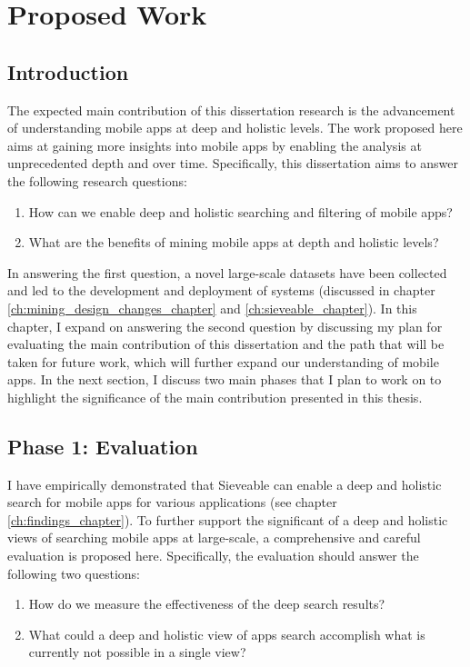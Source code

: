 \chapter{Proposed Work}

\section{Introduction}
\label{ch:propsal}
The expected main contribution of this dissertation research is the advancement of understanding mobile apps at deep and holistic levels.
The work proposed here aims at gaining more insights into mobile apps by enabling the analysis at unprecedented depth and over time.
Specifically, this dissertation aims to answer the following research questions:

\begin{enumerate}
	\item How can we enable deep and holistic searching and filtering of mobile apps?
	\item What are the benefits of mining mobile apps at depth and holistic levels?
\end{enumerate}

In answering the first question, a novel large-scale datasets have been collected and led to the development and deployment of systems (discussed in chapter \ref{ch:mining_design_changes_chapter} and \ref{ch:sieveable_chapter}).
In this chapter, I expand on answering the second question by discussing my plan for evaluating the main contribution of this dissertation and the path that will be taken for future work, which will further expand our understanding of mobile apps.
In the next section, I discuss two main phases that I plan to work on to highlight the significance of the main contribution presented in this thesis.


\section{Phase 1: Evaluation}
I have empirically demonstrated that Sieveable can enable a deep and holistic search for mobile apps for various applications (see chapter \ref{ch:findings_chapter}).
To further support the significant of a deep and holistic views of searching mobile apps at large-scale, a comprehensive and careful evaluation is proposed here.
Specifically, the evaluation should answer the following two questions:
\begin{enumerate}
	\item How do we measure the effectiveness of the deep search results?
	\item What could a deep and holistic view of apps search accomplish what is currently not possible in a single view?
\end{enumerate}

